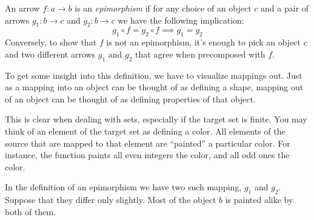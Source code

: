 \documentclass[DaoFP]{subfiles}
\begin{document}
An arrow $f \colon a \to b$ is an \emph{epimorphism} if for any choice of an object $c$ and a pair of arrows $g_1 \colon b \to c$ and $g_2 \colon b \to c$ we have the following implication:
\[ g_1 \circ f = g_2 \circ f \implies g_1 = g_2 \]
Conversely, to show that $f$ is not an epimorphism, it's enough to pick an object $c$ and two different arrows $g_1$ and $g_2$ that agree when precomposed with $f$.

To get some insight into this definition, we have to visualize mappings out. Just as a mapping into an object can be thought of as defining a shape, mapping out of an object can be thought of as defining properties of that object. 

This is clear when dealing with sets, especially if the target set is finite. You may think of an element of the target set as defining a color. All elements of the source that are mapped to that element are ``painted'' a particular color. For instance, the function  paints all even integers the  color, and all odd ones the  color.

In the definition of an epimorphism we have two such mapping, $g_1$ and $g_2$. Suppose that they differ only slightly. Most of the object $b$ is painted alike by both of them.
\end{document}

